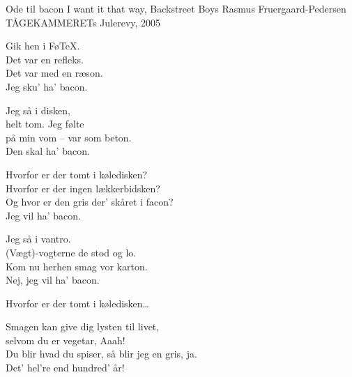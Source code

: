 \begin{song}{Ode til bacon}
  {} %
  {I want it that way, Backstreet Boys} %
  {Rasmus Fruergaard-Pedersen} %
  {TÅGEKAMMERETs Julerevy, 2005} %
  {\NotCCLIed} %

  \begin{SBVerse}
    Gik hen i Fø\TeX.\\
    Det var en refleks.\\
    Det var med en ræson.\\
    Jeg sku’ ha’ bacon.
  \end{SBVerse}

  \begin{SBVerse}
    Jeg så i disken,\\
    helt tom. Jeg følte\\
    på min vom – var som beton.\\
    Den skal ha’ bacon.
  \end{SBVerse}

  \begin{SBChorus}
    Hvorfor er der tomt i køledisken?\\
    Hvorfor er der ingen lækkerbidsken?\\
    Og hvor er den gris der’ skåret i facon?\\
    Jeg vil ha’ bacon.
  \end{SBChorus}

  \begin{SBVerse}
    Jeg så i vantro.\\
    (Vægt)-vogterne de stod og lo.\\
    Kom nu herhen smag vor karton.\\
    Nej, jeg vil ha’ bacon.
  \end{SBVerse}

  \begin{SBChorus}
    Hvorfor er der tomt i køledisken\ldots
  \end{SBChorus}

  \begin{SBSection*}
    Smagen kan give dig lysten til livet,\\
    selvom du er vegetar, Aaah!\\
    Du blir hvad du spiser, så blir jeg en gris, ja.\\
    Det’ hel’re end hundred’ år!
  \end{SBSection*}


\end{song}
